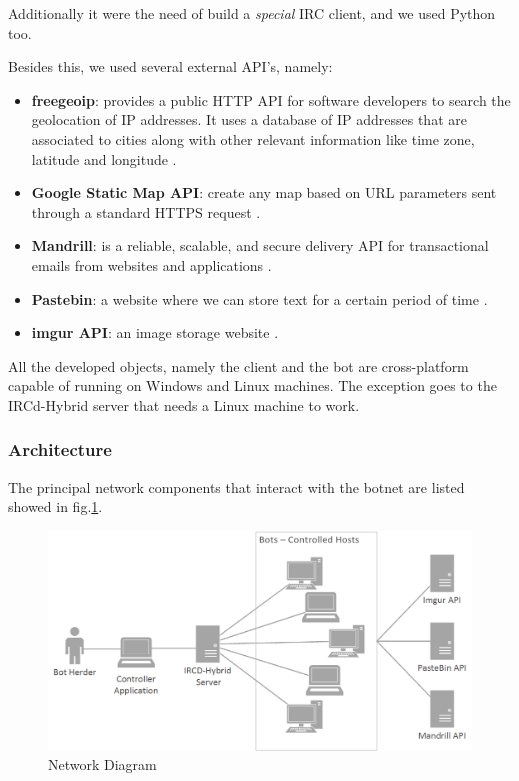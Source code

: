\documentclass[]{article}
\begin{document}
Additionally it were the need of build a \textit{special} IRC client, and we used Python too.

Besides this, we used several external API's, namely:

\begin{itemize}
	\item \textbf{freegeoip}: provides a public HTTP API for software developers to search the geolocation of IP addresses. It uses a database of IP addresses that are associated to cities along with other relevant information like time zone, latitude and longitude \cite{app:freegeoip}.
	\item \textbf{Google Static Map API}: create any map based on URL parameters sent through a standard HTTPS request \cite{app:maps}.
	\item \textbf{Mandrill}: is a reliable, scalable, and secure delivery API for transactional emails from websites and applications \cite{app:mandrill}.
	\item \textbf{Pastebin}: a website where we can store text for a certain period of time \cite{app:pastebin}. 
	\item \textbf{imgur API}: an image storage website \cite{app:imgur}.
\end{itemize}

All the developed objects, namely the client and the bot are cross-platform capable of running on Windows and Linux machines. The exception goes to the IRCd-Hybrid server that needs a Linux machine to work.

\subsubsection{Architecture}

The principal network components that interact with the botnet are listed showed in fig.\ref{fig:network}.

\begin{figure}
	\centering
	\includegraphics[width=1\textwidth]{network_diagram.png}
	\caption{Network Diagram}
	\label{fig:network}
\end{figure}
\end{document}
